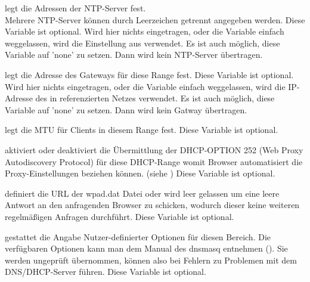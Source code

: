 \begin{description}

    {legt die Adressen der NTP-Server fest. \\
    Mehrere NTP-Server können durch Leerzeichen getrennt angegeben werden. 
    Diese Variable ist optional. Wird hier nichts eingetragen, oder die Variable einfach weggelassen,
    wird die Einstellung aus  verwendet. 
    Es ist auch möglich, diese Variable auf 'none' zu setzen. Dann wird kein NTP-Server übertragen.}

    
    {legt die Adresse des Gateways für diese Range fest.
    Diese Variable ist optional. Wird hier nichts eingetragen, oder die Variable einfach weggelassen,
    wird die IP-Adresse des in  referenzierten Netzes verwendet.
    Es ist auch möglich, diese Variable auf 'none' zu setzen. Dann wird kein Gatway übertragen.}

    
    {legt die MTU für Clients in diesem Range fest.
    Diese Variable ist optional.}

     
     {aktiviert oder deaktiviert die Übermittlung der DHCP-OPTION 252 (Web Proxy Autodiscovery Protocol)
     für diese DHCP-Range womit Browser automatisiert die Proxy-Einstellungen beziehen können.
     (siehe )
     Diese Variable ist optional.
     }
     
     
     {definiert die URL der wpad.dat Datei oder wird leer gelassen um eine leere Antwort
     an den anfragenden Browser zu schicken, wodurch dieser keine weiteren regelmäßigen Anfragen durchführt.
     Diese Variable ist optional.
     }

    
    
    {gestattet die Angabe Nutzer-definierter Optionen für diesen Bereich.
    Die verfügbaren Optionen kann man dem Manual des dnsmasq entnehmen
    ().
    Sie werden ungeprüft übernommen, können also bei Fehlern zu Problemen
    mit dem DNS/DHCP-Server führen.
    Diese Variable ist optional.}


\end{description}
